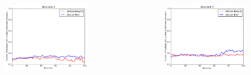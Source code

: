 \documentclass[english]{beamer}
\begin{document}
\begin{frame}
\begin{columns}[t]
        \vspace{-4ex}
        \begin{figure}
            \includegraphics[width=0.85\textwidth]{figures/Complex_hydrophobic_core/hydrophobic_cont_structure2.pdf}  
        \end{figure}      
        \vspace{-5ex}
        \begin{figure}
            \includegraphics[width=0.85\textwidth]{figures/Complex_hydrophobic_core/hydrophobic_cont_structure4.pdf}  
        \end{figure}       

    \end{columns}   
    
\end{frame}       

\end{document}
